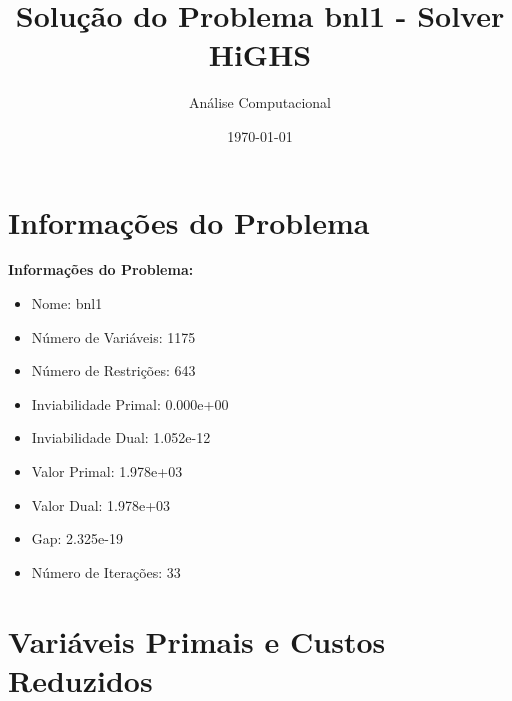 \documentclass[12pt]{article}
\title{Solução do Problema bnl1 - Solver HiGHS}
\author{Análise Computacional}
\date{\today}
\begin{document}
\maketitle

\section{Informações do Problema}

\textbf{Informações do Problema:}
\begin{itemize}
\item Nome: bnl1
\item Número de Variáveis: 1175
\item Número de Restrições: 643
\item Inviabilidade Primal: 0.000e+00
\item Inviabilidade Dual: 1.052e-12
\item Valor Primal: 1.978e+03
\item Valor Dual: 1.978e+03
\item Gap: 2.325e-19
\item Número de Iterações: 33
\end{itemize}


\section{Variáveis Primais e Custos Reduzidos}
\end{document}
